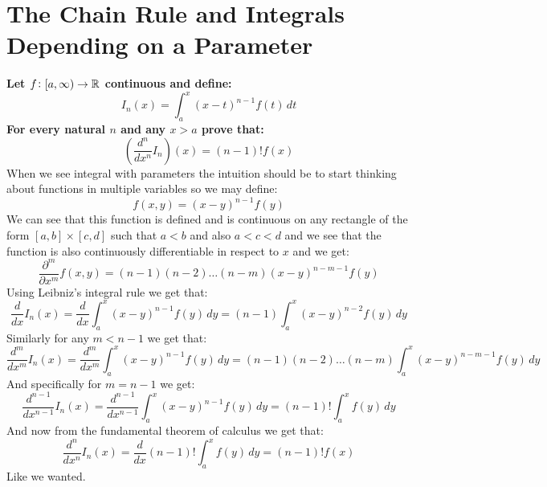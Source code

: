 \documentclass[11pt,a4paper]{article}
\begin{document}
	\newpage
	
	\section{The Chain Rule and Integrals Depending on a Parameter}
	\textbf{Let $f\colon[a,\infty) \to \mathbb{R}$ continuous and define:
	\[
		I_n(x) = \int_{a}^{x}{(x-t)^{n-1}f(t)\,dt}
	\]
	For every natural $n$ and any $x > a$ prove that:
	\[
		\left(\frac{d^n}{dx^n} I_n\right)(x) = (n-1)! f(x)
	\]}
	When we see integral with parameters the intuition should be to start
	thinking about functions in multiple variables so we may define:
	\[
		f(x,y) = (x-y)^{n-1}f(y)
	\]
	We can see that this function is defined and is continuous on any 
	rectangle of the form $[a,b]\times[c,d]$ such that $a < b$ and also
	$a < c < d$ and we see that the function is also continuously 
	differentiable in respect to $x$ and we get:
	\[
		\frac{\partial^m}{\partial x^m}f(x,y) = 
		(n-1)(n-2)\dots(n-m)(x-y)^{n-m-1}f(y)
	\]
	Using Leibniz's integral rule we get that:
	\[
		\frac{d}{dx}I_n(x) = 
		\frac{d}{dx}\int_{a}^{x}{(x-y)^{n-1}f(y)\,dy} = 
		(n-1)\int_{a}^{x}{(x-y)^{n-2}f(y)\,dy}
	\]
	Similarly for any $m < n-1$ we get that:
	\[
		\frac{d^m}{dx^m}I_n(x) = 
		\frac{d^m}{dx^m}\int_{a}^{x}{(x-y)^{n-1}f(y)\,dy} = 
		(n-1)(n-2)\dots(n-m)\int_{a}^{x}{(x-y)^{n-m-1}f(y)\,dy}
	\]
	And specifically for $m = n - 1$ we get:
	\[
		\frac{d^{n-1}}{dx^{n-1}}I_n(x) = 
		\frac{d^{n-1}}{dx^{n-1}}\int_{a}^{x}{(x-y)^{n-1}f(y)\,dy} = 
		(n-1)!\int_{a}^{x}{f(y)\,dy}
	\]
	And now from the fundamental theorem of calculus we get that:
	\[
		\frac{d^{n}}{dx^{n}}I_n(x) = 
		\frac{d}{dx}(n-1)!\int_{a}^{x}{f(y)\,dy} = 
		(n-1)!f(x)
	\]
	Like we wanted.
	
	\newpage
	
\end{document}
